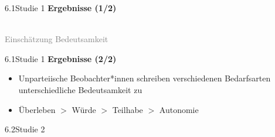\documentclass[xcolor=table,9pt,aspectratio=169]{beamer}
\begin{document}
\begin{frame}{\vspace*{10mm}6.1\hspace*{1em}Studie 1}
\textbf{Ergebnisse (1/2)}\\
\medskip
\begin{center}
   \\
   \textcolor{gray}{Einschätzung Bedeutsamkeit}
\end{center}
\end{frame}


\begin{frame}{\vspace*{10mm}6.1\hspace*{1em}Studie 1}
\textbf{Ergebnisse (2/2)}\\
\medskip
\begin{itemize}
   \item Unparteiische Beobachter*innen schreiben verschiedenen Bedarfsarten unterschiedliche Bedeutsamkeit zu
   \item Überleben $>$ Würde $>$ Teilhabe $>$ Autonomie
\end{itemize}
\end{frame}


\begin{frame}
\begin{overlayarea}{\textwidth}{0.81\paperheight}{
   \vspace*{11mm}
   \textcolor{uolblue}
   {6.2\hspace*{1em}Studie 2}
}
\end{overlayarea}
\end{frame}
\end{document}
